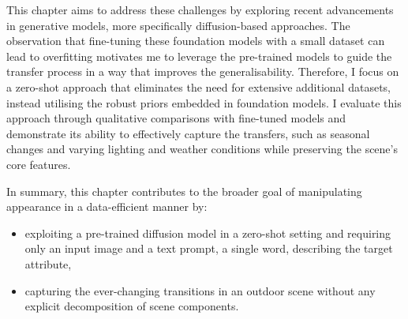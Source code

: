 This chapter aims to address these challenges by exploring recent advancements in generative models, more specifically diffusion-based approaches. The observation that fine-tuning these foundation models with a small dataset can lead to overfitting motivates me to leverage the pre-trained models to guide the transfer process in a way that improves the generalisability. Therefore, I focus on a zero-shot approach that eliminates the need for extensive additional datasets, instead utilising the robust priors embedded in foundation models. I evaluate this approach through qualitative comparisons with fine-tuned models and demonstrate its ability to effectively capture the transfers, such as seasonal changes and varying lighting and weather conditions while preserving the scene's core features.


In summary, this chapter contributes to the broader goal of manipulating appearance in a data-efficient manner by: 

\begin{itemize}

   \item exploiting a pre-trained diffusion model in a zero-shot setting and requiring only an input image and a text prompt, a single word, describing the target attribute,
    
   \item capturing the ever-changing transitions in an outdoor scene without any explicit decomposition of scene components.

\end{itemize}

